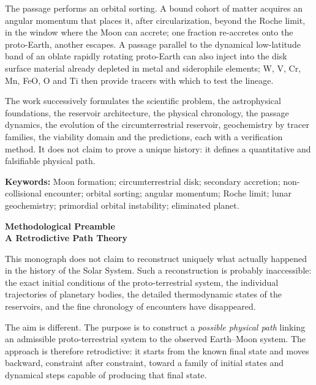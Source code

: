 \documentclass[11pt,a4paper,openany]{report}
\begin{document}
The passage performs an orbital sorting. A bound cohort of matter acquires an angular momentum
that places it, after circularization, beyond the Roche limit, in the window where the Moon can
accrete; one fraction re-accretes onto the proto-Earth, another escapes. A passage parallel to the
dynamical low-latitude band of an oblate rapidly rotating proto-Earth can also inject into the disk
surface material already depleted in metal and siderophile elements; W, V, Cr, Mn, FeO, O and Ti
then provide tracers with which to test the lineage.

The work successively formulates the scientific problem, the astrophysical foundations, the
reservoir architecture, the physical chronology, the passage dynamics, the evolution of the
circumterrestrial reservoir, geochemistry by tracer families, the viability domain and the
predictions, each with a verification method. It does not claim to prove a unique history: it
defines a quantitative and falsifiable physical path.

\bigskip
\noindent\textbf{Keywords:} Moon formation; circumterrestrial disk; secondary accretion;
non-collisional encounter; orbital sorting; angular momentum; Roche limit; lunar geochemistry; primordial orbital instability; eliminated planet.


\clearpage
\thispagestyle{plain}
{}
\begin{center}
{\Large\bfseries Methodological Preamble}\\[4pt]
{\large\bfseries A Retrodictive Path Theory}
\end{center}
\medskip

This monograph does not claim to reconstruct uniquely what actually happened
in the history of the Solar System. Such a reconstruction is probably
inaccessible: the exact initial conditions of the proto-terrestrial system, the
individual trajectories of planetary bodies, the detailed thermodynamic states
of the reservoirs, and the fine chronology of encounters have disappeared.

The aim is different. The purpose is to construct a \emph{possible physical
path} linking an admissible proto-terrestrial system to the observed
Earth--Moon system. The approach is therefore retrodictive: it starts from the
known final state and moves backward, constraint after constraint, toward a
family of initial states and dynamical steps capable of producing that final
state.
\end{document}
